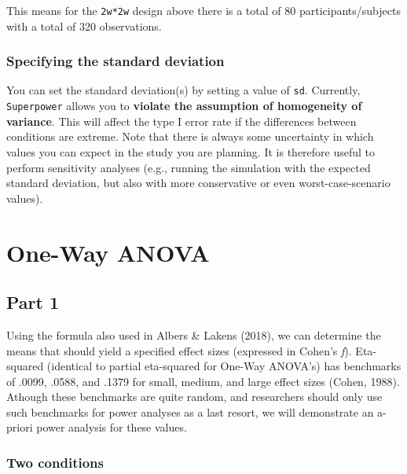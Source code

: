 \documentclass[]{book}
\begin{document}
This means for the \texttt{2w*2w} design above there is a total of 80 participants/subjects with a total of 320 observations.

\hypertarget{specifying-the-standard-deviation}{%
\subsection{Specifying the standard deviation}\label{specifying-the-standard-deviation}}

You can set the standard deviation(s) by setting a value of \texttt{sd}. Currently, \texttt{Superpower} allows you to \textbf{violate the assumption of homogeneity of variance}. This will affect the type I error rate if the differences between conditions are extreme. Note that there is always some uncertainty in which values you can expect in the study you are planning. It is therefore useful to perform sensitivity analyses (e.g., running the simulation with the expected standard deviation, but also with more conservative or even worst-case-scenario values).

\hypertarget{one-way-anova}{%
\chapter{One-Way ANOVA}\label{one-way-anova}}

\hypertarget{part-1}{%
\section{Part 1}\label{part-1}}

Using the formula also used in Albers \& Lakens (2018), we can determine the means that should yield a specified effect sizes (expressed in Cohen's \emph{f}). Eta-squared (identical to partial eta-squared for One-Way ANOVA's) has benchmarks of .0099, .0588, and .1379 for small, medium, and large effect sizes (Cohen, 1988). Athough these benchmarks are quite random, and researchers should only use such benchmarks for power analyses as a last resort, we will demonstrate an a-priori power analysis for these values.

\hypertarget{two-conditions}{%
\subsection{Two conditions}\label{two-conditions}}
\end{document}

